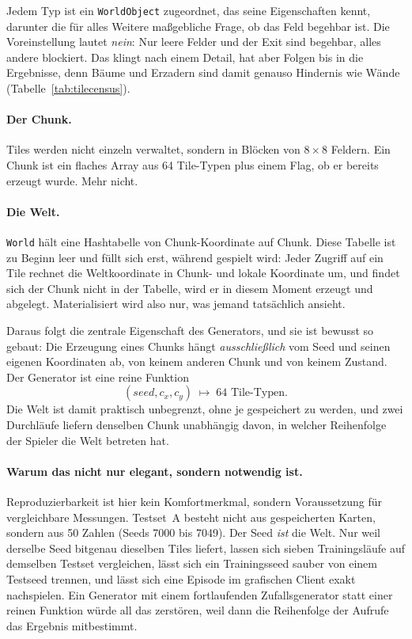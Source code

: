 \documentclass[11pt,a4paper]{article}
\begin{document}
Jedem Typ ist ein \texttt{WorldObject} zugeordnet, das seine Eigenschaften
kennt, darunter die für alles Weitere maßgebliche Frage, ob das Feld begehbar
ist. Die Voreinstellung lautet \emph{nein}: Nur leere Felder und der
Exit sind begehbar, alles andere blockiert. Das klingt nach einem Detail, hat
aber Folgen bis in die Ergebnisse, denn Bäume und Erzadern sind damit
genauso Hindernis wie Wände (Tabelle~\ref{tab:tilecensus}).

\paragraph{Der Chunk.} Tiles werden nicht einzeln verwaltet, sondern in
Blöcken von $8\times8$ Feldern. Ein Chunk ist ein flaches Array aus 64
Tile-Typen plus einem Flag, ob er bereits erzeugt wurde. Mehr nicht.

\paragraph{Die Welt.} \texttt{World} hält eine Hashtabelle von
Chunk-Koordinate auf Chunk. Diese Tabelle ist zu Beginn leer und füllt sich
erst, während gespielt wird: Jeder Zugriff auf ein Tile rechnet die
Weltkoordinate in Chunk- und lokale Koordinate um, und findet sich der Chunk
nicht in der Tabelle, wird er in diesem Moment erzeugt und abgelegt.
Materialisiert wird also nur, was jemand tatsächlich ansieht.

Daraus folgt die zentrale Eigenschaft des Generators, und sie ist bewusst so
gebaut: Die Erzeugung eines Chunks hängt \emph{ausschließlich} vom Seed und
seinen eigenen Koordinaten ab, von keinem anderen Chunk und von keinem
Zustand. Der Generator ist eine reine Funktion
\begin{equation}
  (\mathit{seed}, c_x, c_y) \;\longmapsto\; \text{64 Tile-Typen}.
\end{equation}
Die Welt ist damit praktisch unbegrenzt, ohne je gespeichert zu werden, und
zwei Durchläufe liefern denselben Chunk unabhängig davon, in welcher
Reihenfolge der Spieler die Welt betreten hat.

\paragraph{Warum das nicht nur elegant, sondern notwendig ist.}
Reproduzierbarkeit ist hier kein Komfortmerkmal, sondern Voraussetzung für
vergleichbare Messungen. Testset~A besteht nicht aus gespeicherten Karten,
sondern aus 50 Zahlen (Seeds 7000 bis 7049). Der Seed \emph{ist} die
Welt. Nur weil derselbe Seed bitgenau dieselben Tiles liefert, lassen sich
sieben Trainingsläufe auf demselben Testset vergleichen, lässt sich ein
Trainingsseed sauber von einem Testseed trennen, und lässt sich eine Episode
im grafischen Client exakt nachspielen. Ein Generator mit einem
fortlaufenden Zufallsgenerator statt einer reinen Funktion würde all das
zerstören, weil dann die Reihenfolge der Aufrufe das Ergebnis mitbestimmt.
\end{document}
